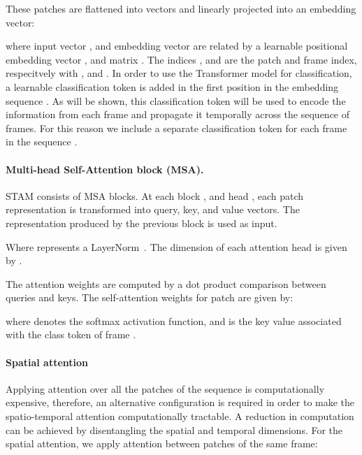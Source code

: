 \documentclass[10pt,twocolumn,letterpaper]{article}
\begin{document}
These patches are flattened into vectors and linearly projected into an embedding vector: 

\vspace{-0.2cm}

where input vector , and embedding vector  are related by a learnable positional embedding vector , and matrix .  The indices , and  are the patch and frame index, respecitvely with , and . In order to use the Transformer model for classification, a learnable classification token is added in the first position in the embedding sequence . As will be shown, this classification token will be used to encode the information from each frame and propagate it temporally across the sequence of frames. For this reason we include a separate classification token for each frame in the sequence .

\paragraph{Multi-head Self-Attention block (MSA).} 

STAM consists of  MSA blocks. At each block , and head , each patch representation is transformed into query, key, and value vectors. The representation produced by the previous block  is used as input. 

Where  represents a LayerNorm~\cite{ba2016layer}. The dimension of each attention head is given by . 

The attention weights are computed by a dot product comparison between queries and keys.  The self-attention weights  for patch  are given by:

\vspace{-0.3cm}

where  denotes the softmax activation function, and  is the key value associated with the class token of frame . 

\paragraph{Spatial attention} Applying attention over all the patches of the sequence is computationally expensive, therefore, an alternative configuration is required in order to make the spatio-temporal attention computationally tractable. 
A reduction in computation can be achieved by disentangling the spatial and temporal dimensions. For the spatial attention, we apply attention between patches of the same frame:

\vspace{-0.3cm}
\end{document}
